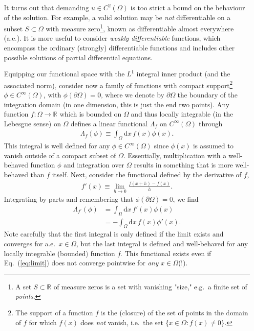 \documentclass[a4paper, twocolumn]{article}
\newcommand{\eq} [1]{Eq.\ (\ref{eq:#1})}
\begin{document}
It turns out that demanding $u\in C^2(\Omega)$ is too strict a bound on the behaviour of the solution. For example, a valid solution may be \textit{not} differentiable on a subset $S\subset\Omega$ with measure zero\footnote{A set $S\subset\mathds{R}$ of measure zeros is a set with vanishing "size," e.g.\ a finite set of \textit{points}.}, known as differentiable almost everywhere (a.e.). It is more useful to consider \textit{weakly differentiable} functions, which encompass the ordinary (strongly) differentiable functions and includes other possible solutions of partial differential equations. 

Equipping our functional space with the $L^1$ integral inner product (and the associated norm), consider now a family of functions with compact support\footnote{The support of a function $f$ is the (closure) of the set of points in the domain of $f$ for which $f(x)$ does \textit{not} vanish, i.e.\ the set $\{x\in\Omega:f(x)\not=0\}$.} $\phi\in C^\infty(\Omega)$, with $\phi(\partial\Omega)=0$, where we denote by $\partial\Omega$ the boundary of the integration domain (in one dimension, this is just the end two points). Any function $f:\Omega\rightarrow\mathds{R}$ which is bounded on $\Omega$ and thus locally integrable (in the Lebesgue sense) on $\Omega$ defines a linear functional $\Lambda_f$ on $C^\infty(\Omega)$ through
\begin{align}
\Lambda_f(\phi)\equiv \int_\Omega\mathrm{d}x\, f(x)\phi(x).
\end{align}
This integral is well defined for any $\phi\in C^\infty(\Omega)$ since $\phi(x)$ is assumed to vanish outside of a compact subset of $\Omega$. Essentially, multiplication with a well-behaved function $\phi$ and integration over $\Omega$ results in something that is more well-behaved than $f$ itself. Next, consider the functional defined by the derivative of $f$, 
\begin{align}
f'(x)\equiv \lim_{h\rightarrow0}\frac{f(x+h)-f(x)}{h}. \label{eq:limit}
\end{align}
Integrating by parts and remembering that $\phi(\partial \Omega)=0$, we find
\begin{align}
\Lambda_{f'}(\phi) &=  \int_\Omega\mathrm{d}x\, f'(x)\phi(x) \nonumber \\
%
&=  -\int_\Omega\mathrm{d}x\, f(x)\phi'(x).
\end{align}
Note carefully that the first integral is only defined if the limit exists and converges for a.e.\ $x\in\Omega$, but the last integral is defined and well-behaved for any locally integrable (bounded) function $f$. This functional exists even if \eq{limit} does not converge pointwise for \textit{any} $x\in\Omega$(!).
\end{document}
